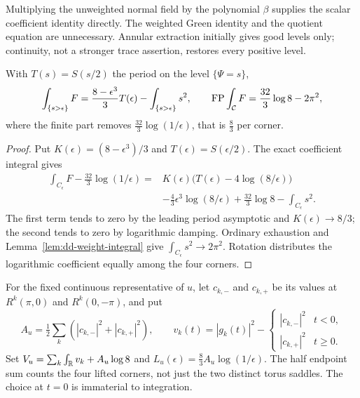 \begin{remark}
Multiplying the unweighted normal field by the polynomial $\beta$ supplies
the scalar coefficient identity directly. The weighted Green identity and
the quotient equation are unnecessary. Annular extraction initially gives
good levels only; continuity, not a stronger trace assertion, restores every
positive level.
\end{remark}

\begin{lemma}
\label{lem:dd-finite-part}
\leanok
With $T(s)=S(s/2)$ the period on the level $\{\Psi=s\}$,
\[
  \int_{\{s>\epsilon\}}F=\frac{8-\epsilon^3}3T(\epsilon)-\int_{\{s>\epsilon\}}s^2,
  \qquad
  \operatorname{FP}\int_{\mathcal{C}} F=\frac{32}3\log8-2\pi^2,
\]
where the finite part removes $\tfrac{32}{3}\log(1/\epsilon)$, that is
$\tfrac83$ per corner.
\end{lemma}

\begin{proof}
\leanok
Put $K(\epsilon)=(8-\epsilon^3)/3$ and $T(\epsilon)=S(\epsilon/2)$.
The exact coefficient integral gives
\begin{align*}
 \int_{C_\epsilon}F-\tfrac{32}{3}\log(1/\epsilon)
 ={}&K(\epsilon)\bigl(T(\epsilon)-4\log(8/\epsilon)\bigr)\\
 &-\tfrac43\epsilon^3\log(8/\epsilon)
   +\tfrac{32}{3}\log8-\int_{C_\epsilon}s^2.
\end{align*}
The first term tends to zero by the leading period asymptotic and
$K(\epsilon)\to8/3$; the second tends to zero by logarithmic damping.
Ordinary exhaustion and Lemma~\ref{lem:dd-weight-integral} give
$\int_{C_\epsilon}s^2\to2\pi^2$. Rotation distributes the logarithmic
coefficient equally among the four corners.
\end{proof}

\begin{definition}
\label{def:dd-value-renormalization}
\leanok
For the fixed continuous representative of $u$, let $c_{k,-}$ and $c_{k,+}$
be its values at $R^k(\pi,0)$ and $R^k(0,-\pi)$, and put
\[
 A_u=\tfrac12\sum_k(|c_{k,-}|^2+|c_{k,+}|^2),\qquad
 v_k(t)=|g_k(t)|^2-
 \begin{cases}|c_{k,-}|^2&t<0,\\|c_{k,+}|^2&t\ge0.\end{cases}
\]
Set $V_u=\sum_k\int_{\mathbb{R}} v_k+A_u\log8$ and
$L_u(\epsilon)=\tfrac83A_u\log(1/\epsilon)$.
The half endpoint sum counts the four lifted corners, not just the two
distinct torus saddles. The choice at $t=0$ is immaterial to integration.
\end{definition}

